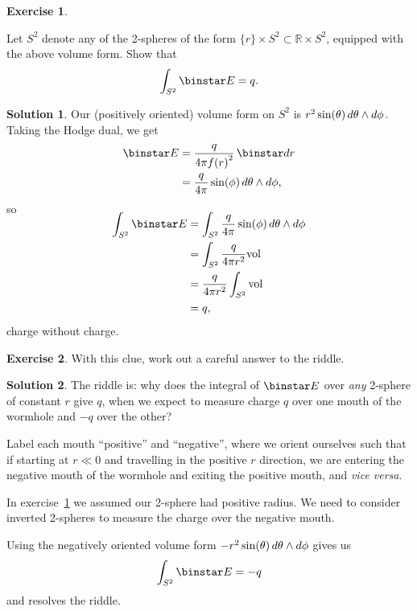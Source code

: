 \documentclass[11pt, a4paper]{report}
\theoremstyle{definition}
\newtheorem{exercise}{Exercise}[part]
\newtheorem{solution}{Solution}[part]
\newenvironment{ex}{\begin{exercise}}{\end{exercise}\pagebreak[1]}
\newenvironment{sol}{\begin{solution}}{\end{solution}\pagebreak[3]}
\newcommand*{\op}[1]{\ensuremath\mathop{}\mathopen{}#1}
\renewcommand*{\d}{\op{d}}
\renewcommand*{\star}{\op{\binstar}\mathord{}}
\begin{document}
\begin{ex}\label{ex:chargewithoutcharge}

Let $S^2$ denote any of the 2-spheres of the form $\{r\} \times S^2 \subset \mathbb{R} \times S^2$, equipped with the above volume form. Show that
\[
    \int_{S^2} \star E = q.
\]

\end{ex}

\begin{sol}

Our (positively oriented) volume form on $S^2$ is $r^2 \sin(\theta) \d \theta \wedge d\phi$.
Taking the Hodge dual, we get
\begin{align*}
    \star E &= \frac{q}{4 \pi {f(r)}^2} \star dr \\
            &= \frac{q}{4 \pi} \sin(\phi) \d \theta \wedge d\phi,
\end{align*}
so
\begin{align*}
    \SwapAboveDisplaySkip
    \int_{S^2} \star E &= \int_{S^2} \frac{q}{4 \pi} \sin(\phi) \d \theta \wedge d\phi \\
        &= \int_{S^2} \frac{q}{4 \pi r^2} \text{vol} \\
        &= \frac{q}{4 \pi r^2} \int_{S^2} \text{vol} \\
        &= q,
\end{align*}
charge without charge.

\end{sol}

\begin{ex}

With this clue, work out a careful answer to the riddle.

\end{ex}

\begin{sol}

The riddle is: why does the integral of $\star E$ over \emph{any} 2-sphere of constant $r$ give $q$, when we expect to measure charge $q$ over  one mouth of the wormhole and $-q$ over the other?

Label each mouth ``positive'' and ``negative'', where we orient ourselves such that if starting at $r \ll 0$ and travelling in the positive $r$ direction, we are entering the negative mouth of the wormhole and exiting the positive mouth, and \emph{vice versa}.

In exercise~\ref{ex:chargewithoutcharge} we assumed our 2-sphere had positive radius.
We need to consider inverted 2-spheres to measure the charge over the negative mouth.

Using the negatively oriented volume form $-r^2 \sin(\theta) \d \theta \wedge d\phi$ gives us
\[
    \int_{S^2} \star E = -q
\]
and resolves the riddle.

\end{sol}
\end{document}
